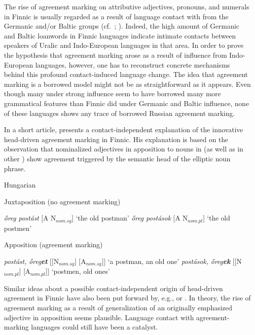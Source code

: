 {The rise of agreement marking on attributive adjectives, pronouns, and numerals in Finnic is usually regarded as a result of language contact with  from the Germanic and/or Baltic groups (cf.~\citealt[25]{tauli1955}; \citealt{hajdu1996}). Indeed, the high amount of Germanic and Baltic loanwords in Finnic languages indicate intimate contacts between speakers of Uralic and Indo-European languages in that area. In order to prove the hypothesis that agreement marking arose as a result of influence from Indo-European languages, however, one has to reconstruct concrete mechanisms behind this profound contact-induced language change. The idea that agreement marking is a borrowed model might not be as straightforward as it appears. Even though many  under strong  influence seem to have borrowed many more grammatical features than Finnic did under Germanic and Baltic influence, none of these languages shows any trace of borrowed Russian agreement marking.

In a short article, \citet{mark1979} presents a contact-independent explanation of the innovative head\hyp{}driven agreement marking in Finnic. His explanation is based on the observation that nominalized adjectives in apposition to nouns in  (as well as in other ) show agreement triggered by the semantic head of the elliptic noun phrase.
\begin{exe} \label{hung ap}
\ex \rm{Hungarian \citep[209]{mark1979}}
\begin{xlist}
\ex \rm{Juxtaposition (no agreement marking)}
\begin{xlist}
\ex \textit{őreg postást} 		\rm{[A N$_{nom.sg}$] ‘the old postman’}
\ex \textit{őreg postások} 		\rm{[A N$_{nom.pl}$] ‘the old postmen’}
\end{xlist}
\ex \rm{Apposition (agreement marking)}
\begin{xlist}
\ex \textit{postást, őreg\textbf{et}} 	\rm{[[N$_{nom.sg}$] [A$_{nom.sg}$]] ‘a postman, an old one’}
\ex \textit{postások, őreg\textbf{ek}} 	\rm{[[N$_{nom.pl}$] [A$_{nom.pl}$]] ‘postmen, old ones’}
\end{xlist}
\end{xlist}
\end{exe}
Similar ideas about a possible contact-independent origin of head\hyp{}driven agreement in Finnic have also been put forward by, e.g., \cite{ravila1941} or \cite{papp1962}. In theory, the rise of agreement marking as a result of generalization of an originally emphasized adjective in apposition seems plausible. Language contact with agreement-marking languages could still have been a catalyst. 

}
